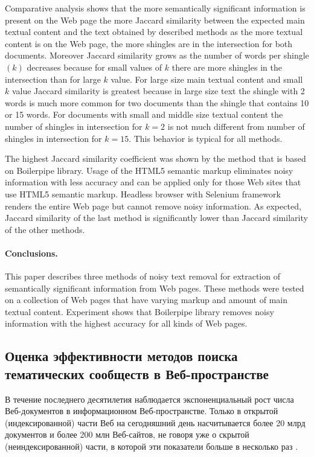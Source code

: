 Comparative analysis shows that the more semantically significant information is present on the Web page the more Jaccard similarity between the expected main textual content and the text obtained by described methods as the more textual content is on the Web page, the more shingles are in the intersection for both documents. Moreover Jaccard similarity grows as the number of words per shingle \((k)\) decreases because for small values of \(k\) there are more shingles in the intersection than for large \(k\) value. For large size main textual content and small \(k\) value Jaccard similarity is greatest because in large size text the shingle with 2 words is much more common for two documents than the shingle that contains 10 or 15 words. For documents with small and middle size textual content the number of shingles in intersection for \(k = 2\) is not much different from number of shingles in intersection for \(k = 15\). This behavior is typical for all methods.

The highest Jaccard similarity coefficient was shown by the method that is based on Boilerpipe library. Usage of the HTML5 semantic markup eliminates noisy information with less accuracy and can be applied only for those Web sites that use HTML5 semantic markup. Headless browser with Selenium framework renders the entire Web page but cannot remove noisy information. As expected, Jaccard similarity of the last method is significantly lower than Jaccard similarity of the other methods.

\paragraph{Conclusions.} This paper describes three methods of noisy text removal for extraction of semantically significant information from Web pages. These methods were tested on a collection of Web pages that have varying markup and amount of main textual content. Experiment shows that Boilerpipe library removes noisy information with the highest accuracy for all kinds of Web pages.

\subsection{Оценка эффективности методов поиска тематических сообществ в Веб-пространстве}\label{subsec:ch1/sec3/sub5}

В течение последнего десятилетия наблюдается экспоненциальный рост числа Веб-документов в информационном Веб-пространстве. Только в открытой (индексированной) части Веб на сегодняшний день насчитывается более 20 млрд документов и более 200 млн Веб-сайтов, не говоря уже о скрытой (неиндексированной) части, в которой эти показатели больше в несколько раз \cite{MostReliableHostingCompanySites}.

